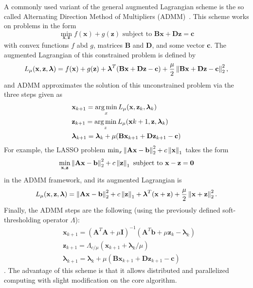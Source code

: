 A commonly used variant of the general augmented Lagrangian scheme is the so called Alternating Direction Method of Multipliers (ADMM)~\cite{gabay_dual_1976}. This scheme works on problems in the form
\[\min_{\mathbf{x},\mathbf{z}} f(\mathbf{x}) + g(\mathbf{z}) \text{ subject to } \mathbf{Bx + Dz = c}\]
with convex functions $f$ abd $g$, matrices $\mathbf{B}$ and $\mathbf{D}$, and some vector $\mathbf{c}$. The augmented Lagrangian of this constrained problem is defined by
\[L_{\mu}(\mathbf{x, z}, \boldsymbol{\lambda}) = f(\mathbf{x}) + g(\mathbf{z}) + \boldsymbol{\lambda}^T(\mathbf{Bx + Dz - c}) + \frac{\mu}{2}\left\lVert\mathbf{Bx + Dz - c}\right\rVert_2^2,\]
and ADMM approximates the solution of this unconstrained problem via the three steps given as
\begin{align*}
    & \mathbf{x}_{k+1} = \operatorname*{arg\,min}_{x} L_{\mu}(\mathbf{x}, \mathbf{z}_k, \boldsymbol{\lambda}_k)\\
    & \mathbf{z}_{k+1} = \operatorname*{arg\,min}_{z} L_{\mu}(\mathbf{x}{k+1}, \mathbf{z}, \boldsymbol{\lambda}_k)\\
    & \boldsymbol{\lambda}_{k+1} = \boldsymbol{\lambda}_k + \mu(\mathbf{Bx}_{k+1} + \mathbf{Dz}_{k+1} - \mathbf{c})
\end{align*}
For example, the LASSO problem $\min_x \left\lVert\mathbf{Ax - b}\right\rVert_2^2 + c \left\lVert\mathbf{x}\right\rVert_1$ takes the form
\[\min_{\mathbf{x,z}} \left\lVert\mathbf{Ax - b}\right\rVert_2^2 + c \left\lVert\mathbf{z}\right\rVert_1 \text{ subject to } \mathbf{x - z = 0}\]
in the ADMM framework, and its augmented Lagrangian is
\[L_{\mu}(\mathbf{x, z}, \boldsymbol{\lambda}) = \left\lVert\mathbf{Ax - b}\right\rVert_2^2 + c \left\lVert\mathbf{z}\right\rVert_1 + \boldsymbol{\lambda}^T(\mathbf{x + z}) + \frac{\mu}{2}\left\lVert\mathbf{x + z}\right\rVert_2^2.\]
Finally, the ADMM steps are the following (using the previously defined soft-thresholding operator $\Lambda$):
\begin{align*}
    & \mathbf{x}_{k+1} = (\mathbf{A}^T\mathbf{A} + \mu \mathbf{I})^{-1}(\mathbf{A}^T\mathbf{b} + \mu \mathbf{z}_k - \boldsymbol{\lambda}_k)\\
    & \mathbf{z}_{k+1} = \Lambda_{c/\mu}(\mathbf{x}_{k+1} + \boldsymbol{\lambda}_k / \mu)\\
    & \boldsymbol{\lambda}_{k+1} = \boldsymbol{\lambda}_k + \mu(\mathbf{Bx}_{k+1} + \mathbf{Dz}_{k+1} - \mathbf{c})
\end{align*}.
The advantage of this scheme is that it allows distributed and parallelized computing with slight modification on the core algorithm.






